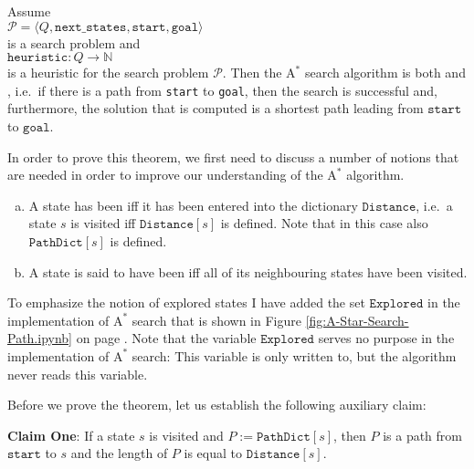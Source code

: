 \begin{Theorem} 
Assume 
\\[0.2cm]
\hspace*{1.3cm}
$\mathcal{P} = \langle Q,\mathtt{next\_states}, \mathtt{start}, \mathtt{goal}\rangle$
\\[0.2cm]
is a search problem and
\\[0.2cm]
\hspace*{1.3cm}
 $\texttt{heuristic}: Q \rightarrow \mathbb{N}$
\\[0.2cm]
is a  heuristic for the search problem $\mathcal{P}$.   Then the $\mathrm{A}^*$ search algorithm is
both  and , i.e.~if there is a path from \texttt{start} to \texttt{goal}, then the
search is successful and, furthermore, the solution that is computed is a shortest path leading from
$\texttt{start}$ to $\texttt{goal}$.
\end{Theorem}

\proof
In order to prove this theorem, we first need to discuss a number of notions that are  needed in
order to improve our understanding of the $\textrm{A}^*$ algorithm.
\begin{enumerate}[(a)]
\item A state has been  iff it has been entered into the dictionary $\texttt{Distance}$, i.e.~a
      state $s$ is visited iff $\mathtt{Distance}[s]$ is defined.   Note that in this case also
      $\mathtt{PathDict}[s]$ is defined.  
\item A state is said to have been  iff all of its neighbouring states have been visited.
\end{enumerate}
To emphasize the notion of explored states I have added the set $\texttt{Explored}$ in the implementation of $\textrm{A}^*$ search that
is shown in Figure \ref{fig:A-Star-Search-Path.ipynb} on page \pageref{fig:A-Star-Search-Path.ipynb}.  
Note that the variable $\texttt{Explored}$ serves no purpose in the implementation of $\textrm{A}^*$ search:
This variable is only written to, but the algorithm never reads this variable.  

Before we prove the theorem, let us establish the following auxiliary claim:
\vspace*{0.2cm}

\noindent
\textbf{Claim One}: If a state $s$ is visited and
$P := \texttt{PathDict}[s]$, then $P$ is a path from $\texttt{start}$ to $s$ and the length of
$P$ is equal to $\texttt{Distance}[s]$.  
\vspace*{0.2cm}

